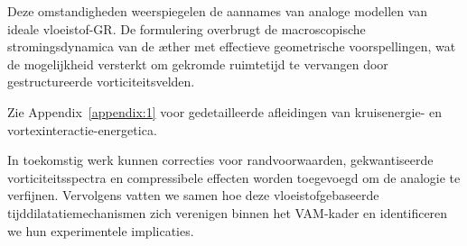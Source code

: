 Deze omstandigheden weerspiegelen de aannames van analoge modellen van ideale vloeistof-GR. De formulering overbrugt de macroscopische stromingsdynamica van de æther met effectieve geometrische voorspellingen, wat de mogelijkheid versterkt om gekromde ruimtetijd te vervangen door gestructureerde vorticiteitsvelden.

Zie Appendix~\ref{appendix:1} voor gedetailleerde afleidingen van kruisenergie- en vortexinteractie-energetica.

In toekomstig werk kunnen correcties voor randvoorwaarden, gekwantiseerde vorticiteitsspectra en compressibele effecten worden toegevoegd om de analogie te verfijnen. Vervolgens vatten we samen hoe deze vloeistofgebaseerde tijddilatatiemechanismen zich verenigen binnen het VAM-kader en identificeren we hun experimentele implicaties.